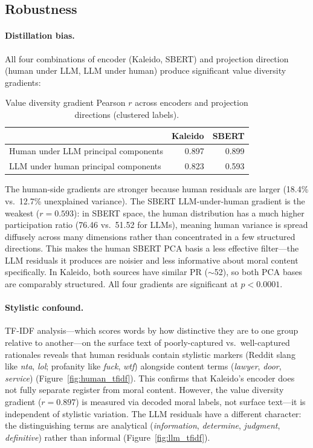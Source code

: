 \documentclass[11pt,a4paper]{article}
\begin{document}
\subsection{Robustness}

\paragraph{Distillation bias.} All four combinations of encoder (Kaleido, SBERT) and projection direction (human under LLM, LLM under human) produce significant value diversity gradients:

\begin{table}[H]
\centering
\caption{Value diversity gradient Pearson $r$ across encoders and projection directions (clustered labels).}
\label{tab:gradient_matrix}
\begin{tabular}{lrr}
\toprule
 & Kaleido & SBERT \\
\midrule
Human under LLM principal components & 0.897 & 0.899 \\
LLM under human principal components  & 0.823 & 0.593 \\
\bottomrule
\end{tabular}
\end{table}

The human-side gradients are stronger because human residuals are larger (18.4\% vs.\ 12.7\% unexplained variance). The SBERT LLM-under-human gradient is the weakest ($r = 0.593$): in SBERT space, the human distribution has a much higher participation ratio (76.46 vs.\ 51.52 for LLMs), meaning human variance is spread diffusely across many dimensions rather than concentrated in a few structured directions. This makes the human SBERT PCA basis a less effective filter---the LLM residuals it produces are noisier and less informative about moral content specifically. In Kaleido, both sources have similar PR ($\sim$52), so both PCA bases are comparably structured. All four gradients are significant at $p < 0.0001$.

\paragraph{Stylistic confound.} TF-IDF analysis---which scores words by how distinctive they are to one group relative to another---on the surface text of poorly-captured vs.\ well-captured rationales reveals that human residuals contain stylistic markers (Reddit slang like \emph{nta}, \emph{lol}; profanity like \emph{fuck}, \emph{wtf}) alongside content terms (\emph{lawyer}, \emph{door}, \emph{service}) (Figure~\ref{fig:human_tfidf}). This confirms that Kaleido's encoder does not fully separate register from moral content. However, the value diversity gradient ($r = 0.897$) is measured via decoded moral labels, not surface text---it is independent of stylistic variation. The LLM residuals have a different character: the distinguishing terms are analytical (\emph{information}, \emph{determine}, \emph{judgment}, \emph{definitive}) rather than informal (Figure~\ref{fig:llm_tfidf}).
\end{document}
